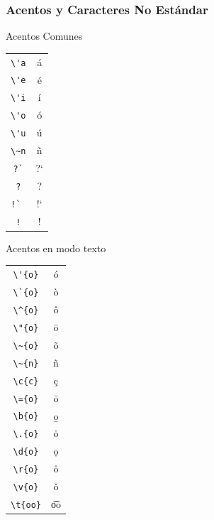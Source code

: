 \documentclass[aspectratio=169]{beamer}%
\begin{document}
\begin{frame}[fragile]
\frametitle{\textbf{Acentos y Caracteres No Estándar}}
\justifying
 \begin{minipage}[l]{0.48\linewidth}
\begin{center}
Acentos Comunes

\begin{tabular}{|c|c|}\hline
  \verb+\'a+&\'a \\
  \verb+\'e+&\'e \\
  \verb+\'i+&\'i \\
  \verb+\'o+&\'o \\
  \verb+\'u+&\'u \\
  \verb+\~n+&\~n \\
  \verb+?`+&?` \\
  \verb+?+&? \\
  \verb+!` +&!`\\
  \verb+!+&! \\\hline
\end{tabular}
\end{center}


\end{minipage}\hfill
\begin{minipage}[r]{0.48\linewidth}
\begin{center}
Acentos en modo texto

\begin{tabular}{|c|c|}\hline
 \verb+\'{o}+ & \'{o}\\
 \verb+\`{o}+ & \`{o}\\
 \verb+\^{o}+ & \^{o}\\
 \verb+\"{o}+ & \"{o}\\
 \verb+\~{o}+ & \~{o}\\
 \verb+\~{n}+ & \~{n}\\
 \verb+\c{c}+ & \c{c}\\
 \verb+\={o}+ & \={o}\\
 \verb+\b{o}+ & \b{o}\\
 \verb+\.{o}+ & \.{o}\\
 \verb+\d{o}+ & \d{o}\\
 \verb+\r{o}+ & \r{o}\\
 \verb+\v{o}+ & \v{o}\\
 \verb+\t{oo}+ & \t{oo}\\
	\hline
\end{tabular}

\end{center}

\end{minipage}

\end{frame}
\end{document}
